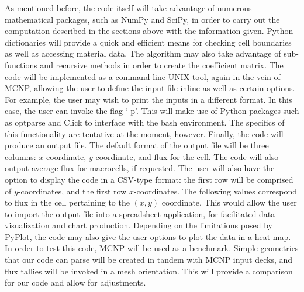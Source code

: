 As mentioned before, the code itself will take advantage of numerous mathematical packages, such as NumPy and SciPy, in order to carry out the computation described in the sections above with the information given. Python dictionaries will provide a quick and efficient means for checking cell boundaries as well as accessing material data. The algorithm may also take advantage of sub-functions and recursive methods in order to create the coefficient matrix. The code will be implemented as a command-line UNIX tool, again in the vein of MCNP, allowing the user to define the input file inline as well as certain options. For example, the user may wish to print the inputs in a different format. In this case, the user can invoke the flag `-p'. This will make use of Python packages such as optparse and Click to interface with the bash environment. The specifics of this functionality are tentative at the moment, however.
Finally, the code will produce an output file. The default format of the output file will be three columns: $x$-coordinate, $y$-coordinate, and flux for the cell. The code will also output average flux for macrocells, if requested. The user will also have the option to display the code in a CSV-type format: the first row will be comprised of $y$-coordinates, and the first row $x$-coordinates. The following values correspond to flux in the cell pertaining to the $(x,y)$ coordinate. This would allow the user to import the output file into a spreadsheet application, for facilitated data visualization and chart production. Depending on the limitations posed by PyPlot, the code may also give the user options to plot the data in a heat map.
In order to test this code, MCNP will be used as a benchmark. Simple geometries that our code can parse will be created in tandem with MCNP input decks, and flux tallies will be invoked in a mesh orientation. This will provide a comparison for our code and allow for adjustments.
